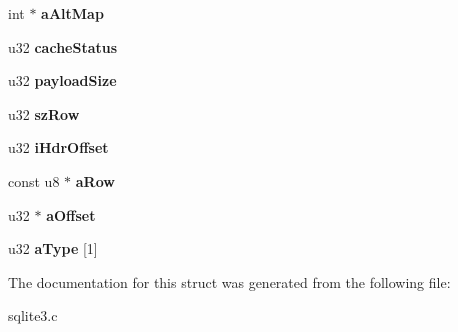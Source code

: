 \begin{DoxyCompactItemize}
\item 
int $\ast$ {\bfseries a\+Alt\+Map}\hypertarget{structVdbeCursor_a78b9a4b46b24e0f7a6b6b58e1e51c2ac}{}\label{structVdbeCursor_a78b9a4b46b24e0f7a6b6b58e1e51c2ac}

\item 
u32 {\bfseries cache\+Status}\hypertarget{structVdbeCursor_acf243b5a94a6e5a11341d6fece473c00}{}\label{structVdbeCursor_acf243b5a94a6e5a11341d6fece473c00}

\item 
u32 {\bfseries payload\+Size}\hypertarget{structVdbeCursor_a92f39b19e82152386e20ede96d177058}{}\label{structVdbeCursor_a92f39b19e82152386e20ede96d177058}

\item 
u32 {\bfseries sz\+Row}\hypertarget{structVdbeCursor_ac0fa6de4df7f418dfd5307cb892ba455}{}\label{structVdbeCursor_ac0fa6de4df7f418dfd5307cb892ba455}

\item 
u32 {\bfseries i\+Hdr\+Offset}\hypertarget{structVdbeCursor_a838b93338c0a8539e28697e291c83a91}{}\label{structVdbeCursor_a838b93338c0a8539e28697e291c83a91}

\item 
const u8 $\ast$ {\bfseries a\+Row}\hypertarget{structVdbeCursor_a6b6f7444963e83e48cd3d63edf539c94}{}\label{structVdbeCursor_a6b6f7444963e83e48cd3d63edf539c94}

\item 
u32 $\ast$ {\bfseries a\+Offset}\hypertarget{structVdbeCursor_a17431e67b341282aeb6c026cd01ec1e9}{}\label{structVdbeCursor_a17431e67b341282aeb6c026cd01ec1e9}

\item 
u32 {\bfseries a\+Type} \mbox{[}1\mbox{]}\hypertarget{structVdbeCursor_aa4a4b02d8b0276a413f1191382469141}{}\label{structVdbeCursor_aa4a4b02d8b0276a413f1191382469141}

\end{DoxyCompactItemize}


The documentation for this struct was generated from the following file\+:\begin{DoxyCompactItemize}
\item 
sqlite3.\+c\end{DoxyCompactItemize}
